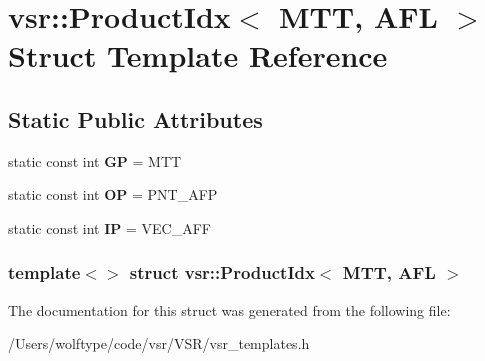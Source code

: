 \hypertarget{structvsr_1_1_product_idx_3_01_m_t_t_00_01_a_f_l_01_4}{\section{vsr\-:\-:Product\-Idx$<$ M\-T\-T, A\-F\-L $>$ Struct Template Reference}
\label{structvsr_1_1_product_idx_3_01_m_t_t_00_01_a_f_l_01_4}
}
\subsection*{Static Public Attributes}
\begin{DoxyCompactItemize}
\item 
\hypertarget{structvsr_1_1_product_idx_3_01_m_t_t_00_01_a_f_l_01_4_a8bb0475a38e81a37b907ce7c95ba6c69}{static const int {\bfseries G\-P} = M\-T\-T}\label{structvsr_1_1_product_idx_3_01_m_t_t_00_01_a_f_l_01_4_a8bb0475a38e81a37b907ce7c95ba6c69}

\item 
\hypertarget{structvsr_1_1_product_idx_3_01_m_t_t_00_01_a_f_l_01_4_a5eec4cc0e42c8aa48fdb4ba5f69d2af1}{static const int {\bfseries O\-P} = P\-N\-T\-\_\-\-A\-F\-P}\label{structvsr_1_1_product_idx_3_01_m_t_t_00_01_a_f_l_01_4_a5eec4cc0e42c8aa48fdb4ba5f69d2af1}

\item 
\hypertarget{structvsr_1_1_product_idx_3_01_m_t_t_00_01_a_f_l_01_4_a2a5134309b2b88ef80c5dc5bb4fd3a24}{static const int {\bfseries I\-P} = V\-E\-C\-\_\-\-A\-F\-F}\label{structvsr_1_1_product_idx_3_01_m_t_t_00_01_a_f_l_01_4_a2a5134309b2b88ef80c5dc5bb4fd3a24}

\end{DoxyCompactItemize}
\subsubsection*{template$<$$>$ struct vsr\-::\-Product\-Idx$<$ M\-T\-T, A\-F\-L $>$}



The documentation for this struct was generated from the following file\-:\begin{DoxyCompactItemize}
\item 
/\-Users/wolftype/code/vsr/\-V\-S\-R/vsr\-\_\-templates.\-h\end{DoxyCompactItemize}
